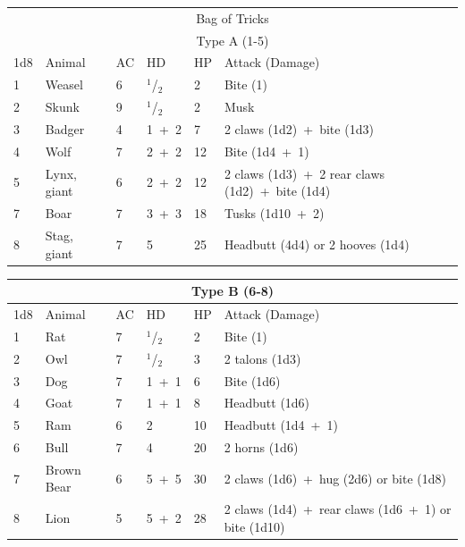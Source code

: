 \noindent \begin{tabular}{|p{}|p{}|p{}|p{}|p{}|p{}|}
\multicolumn{6}{c}{Bag of Tricks} \\
\multicolumn{6}{c}{Type A (1-5)} \\
\hline
1d8	& Animal	& AC	& HD	& HP	& Attack (Damage) \\
\hline\hline
\rowcolor[gray]{0.9}1	& Weasel		& 6		& $^1$/$_2$	& 2		& Bite (1) \\
2	& Skunk		& 9		& $^1$/$_2$	& 2		& Musk \\
\rowcolor[gray]{0.9}3	& Badger		& 4		& 1~+~2		& 7		& 2 claws (1d2)~+~bite (1d3) \\
4	& Wolf		& 7		& 2~+~2		& 12	& Bite (1d4~+~1) \\
\rowcolor[gray]{0.9}5	& Lynx, giant	& 6		& 2~+~2		& 12	& 2 claws (1d3)~+~2 rear claws (1d2)~+~bite (1d4) \\
7	& Boar		& 7		& 3~+~3		& 18	& Tusks (1d10~+~2) \\
\rowcolor[gray]{0.9}8	& Stag, giant	& 7		& 5			& 25	& Headbutt (4d4) or 2 hooves (1d4) \\
\hline
\end{tabular}

\noindent \begin{tabular}{|p{}|p{}|p{}|p{}|p{}|p{}|}
\multicolumn{6}{c}{Type B (6-8)} \\
\hline
1d8	& Animal	& AC	& HD	& HP	& Attack (Damage) \\
\hline\hline
\rowcolor[gray]{0.9}1	& Rat		& 7& 	$^1$/$_2$	& 2	& Bite (1) \\
2	& Owl		& 7	& $^1$/$_2$	& 3	& 2 talons (1d3) \\
\rowcolor[gray]{0.9}3	& Dog		& 7	& 1~+~1		& 6	& Bite (1d6) \\
4	& Goat		& 7	& 1~+~1		& 8	& Headbutt (1d6) \\
\rowcolor[gray]{0.9}5	& Ram		& 6	& 2			& 10	& Headbutt (1d4~+~1) \\
6	& Bull		& 7	& 4			& 20	& 2 horns (1d6) \\
\rowcolor[gray]{0.9}7	& Brown Bear	& 6	& 5~+~5	& 30	& 2 claws (1d6)~+~hug (2d6) or bite (1d8) \\
8	& Lion		& 5	& 5~+~2		& 28	& 2 claws (1d4)~+~rear claws (1d6~+~1) or bite (1d10) \\
\hline
\end{tabular}

